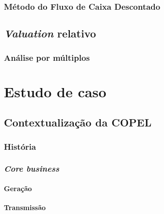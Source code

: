 \documentclass[grad,numbers]{coppe}
\begin{document}
  \hypertarget{muxe9todo-do-fluxo-de-caixa-descontado}{%
  \subsection{Método do Fluxo de Caixa Descontado}\label{muxe9todo-do-fluxo-de-caixa-descontado}}
  
  \hypertarget{valuation-relativo}{%
  \section{\texorpdfstring{\emph{Valuation} relativo}{Valuation relativo}}\label{valuation-relativo}}
  
  \hypertarget{anuxe1lise-por-muxfaltiplos}{%
  \subsection{Análise por múltiplos}\label{anuxe1lise-por-muxfaltiplos}}
  
  \hypertarget{estudo-de-caso}{%
  \chapter{Estudo de caso}\label{estudo-de-caso}}
  
  \hypertarget{contextualizauxe7uxe3o-da-copel}{%
  \section{Contextualização da COPEL}\label{contextualizauxe7uxe3o-da-copel}}
  
  \hypertarget{histuxf3ria}{%
  \subsection{História}\label{histuxf3ria}}
  
  \hypertarget{core-business}{%
  \subsection{\texorpdfstring{\emph{Core business}}{Core business}}\label{core-business}}
  
  \hypertarget{gerauxe7uxe3o-1}{%
  \subsubsection{Geração}\label{gerauxe7uxe3o-1}}
  
  \hypertarget{transmissuxe3o-1}{%
  \subsubsection{Transmissão}\label{transmissuxe3o-1}}
  
\end{document}
